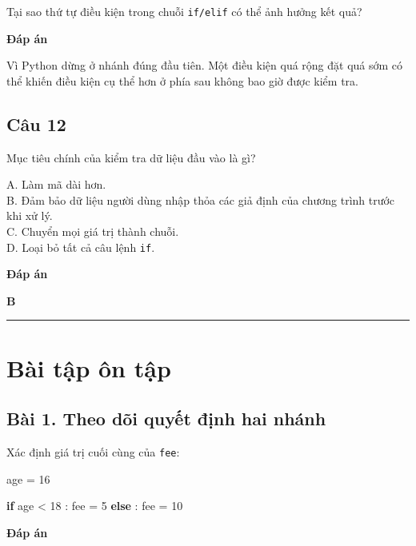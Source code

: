 \documentclass[
  11pt,
  a4paper,
]{article}
\newenvironment{Shaded}{}{}
\newcommand{\ControlFlowTok}[1]{\textcolor[rgb]{0.00,0.44,0.13}{\textbf{#1}}}
\newcommand{\DecValTok}[1]{\textcolor[rgb]{0.25,0.63,0.44}{#1}}
\newcommand{\NormalTok}[1]{#1}
\newcommand{\OperatorTok}[1]{\textcolor[rgb]{0.40,0.40,0.40}{#1}}
\begin{document}
Tại sao thứ tự điều kiện trong chuỗi \texttt{if/elif} có thể ảnh hưởng
kết quả?

\textbf{Đáp án}

Vì Python dừng ở nhánh đúng đầu tiên. Một điều kiện quá rộng đặt quá sớm
có thể khiến điều kiện cụ thể hơn ở phía sau không bao giờ được kiểm
tra.

\subsection{Câu 12}\label{cuxe2u-12}

Mục tiêu chính của kiểm tra dữ liệu đầu vào là gì?

A. Làm mã dài hơn.\\
B. Đảm bảo dữ liệu người dùng nhập thỏa các giả định của chương trình
trước khi xử lý.\\
C. Chuyển mọi giá trị thành chuỗi.\\
D. Loại bỏ tất cả câu lệnh \texttt{if}.

\textbf{Đáp án}

\textbf{B}

\begin{center}\rule{0.5\linewidth}{0.5pt}\end{center}

\section{Bài tập ôn tập}\label{buxe0i-tux1eadp-uxf4n-tux1eadp}

\subsection{Bài 1. Theo dõi quyết định hai
nhánh}\label{buxe0i-1.-theo-duxf5i-quyux1ebft-ux111ux1ecbnh-hai-nhuxe1nh}

Xác định giá trị cuối cùng của \texttt{fee}:

\begin{Shaded}
\begin{Highlighting}[]
\NormalTok{age }\OperatorTok{=} \DecValTok{16}

\ControlFlowTok{if}\NormalTok{ age }\OperatorTok{\textless{}} \DecValTok{18}\NormalTok{ :}
\NormalTok{    fee }\OperatorTok{=} \DecValTok{5}
\ControlFlowTok{else}\NormalTok{ :}
\NormalTok{    fee }\OperatorTok{=} \DecValTok{10}
\end{Highlighting}
\end{Shaded}

\textbf{Đáp án}
\end{document}
